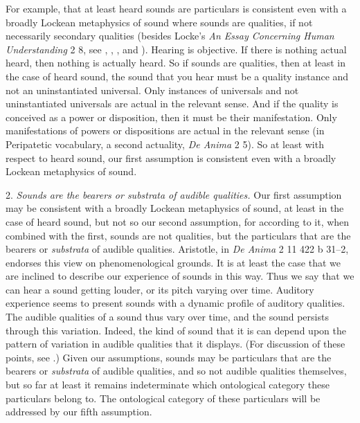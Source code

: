 \documentclass[12pt]{article}
\begin{document}
For example, that at least heard sounds are particulars is consistent even with a broadly Lockean metaphysics of sound where sounds are qualities, if not necessarily secondary qualities (besides Locke's \emph{An Essay Concerning Human Understanding} 2 8, see \citealt{Pasnau:1999ss}, \citealt{Kulvicki:2008aa}, \citealt{Cohen:2010ax}, and \citealt{Roberts:2017as}). Hearing is objective. If there is nothing actual heard, then nothing is actually heard. So if sounds are qualities, then at least in the case of heard sound, the sound that you hear must be a quality instance and not an uninstantiated universal. Only instances of universals and not uninstantiated universals are actual in the relevant sense. And if the quality is conceived as a power or disposition, then it must be their manifestation. Only manifestations of powers or dispositions are actual in the relevant sense (in Peripatetic vocabulary, a second actuality, \emph{De Anima} 2 5). So at least with respect to heard sound, our first assumption is consistent even with a broadly Lockean metaphysics of sound. 

2. \emph{Sounds are the bearers or \emph{substrata} of audible qualities.} Our first assumption may be consistent with a broadly Lockean metaphysics of sound, at least in the case of heard sound, but not so our second assumption, for according to it, when combined with the first, sounds are not qualities, but the particulars that are the bearers or \emph{substrata} of audible qualities. Aristotle, in \emph{De Anima} 2 11 422 b 31--2, endorses this view on phenomenological grounds. It is at least the case that we are inclined to describe our experience of sounds in this way. Thus we say that we can hear a sound getting louder, or its pitch varying over time. Auditory experience seems to present sounds with a dynamic profile of auditory qualities. The audible qualities of a sound thus vary over time, and the sound persists through this variation. Indeed, the kind of sound that it is can depend upon the pattern of variation in audible qualities that it displays. (For discussion of these points, see \citealt{OCallaghan:2010aa}.) Given our assumptions, sounds may be particulars that are the bearers or \emph{substrata} of audible qualities, and so not audible qualities themselves, but so far at least it remains indeterminate which ontological category these particulars belong to. The ontological category of these particulars will be addressed by our fifth assumption.
\end{document}
